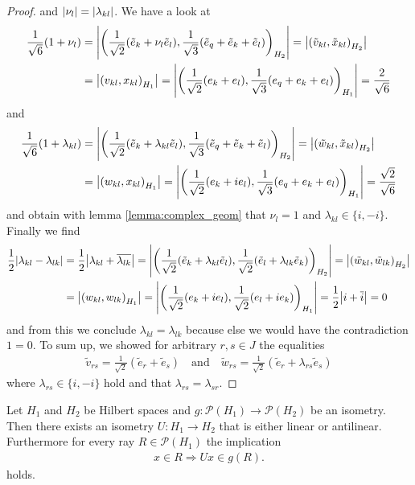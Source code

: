 \begin{proof}
	and ${\left | \nu_l \right |} = {\left | \lambda_{kl} \right |}$. We have a look at 
	\begin{align*}
		\frac{1}{\sqrt{6}}(1 + \nu_l) &= {\left | {\left ( \frac{1}{\sqrt{2}}(\tilde{e}_k + \nu_l \tilde{e}_l), \frac{1}{\sqrt{3}}(\tilde{e}_q + \tilde{e}_k + \tilde{e}_l) \right )}_{H_2} \right |} = {\left | {\left ( \tilde{v}_{kl}, \tilde{x}_{kl} \right )}_{H_2} \right |} \\
		&= {\left | {\left ( v_{kl}, x_{kl} \right )}_{H_1} \right |} = {\left | {\left ( \frac{1}{\sqrt{2}}(e_k + e_l), \frac{1}{\sqrt{3}}(e_q + e_k + e_l) \right )}_{H_1} \right |} = \frac{2}{\sqrt{6}}
	\end{align*}
	and 
	\begin{align*}
		\frac{1}{\sqrt{6}}(1 + \lambda_{kl}) &= {\left | {\left ( \frac{1}{\sqrt{2}}(\tilde{e}_k + \lambda_{kl} \tilde{e}_l), \frac{1}{\sqrt{3}}(\tilde{e}_q + \tilde{e}_k + \tilde{e}_l) \right )}_{H_2} \right |} = {\left | {\left ( \tilde{w}_{kl}, \tilde{x}_{kl} \right )}_{H_2} \right |} \\
		&= {\left | {\left ( w_{kl}, x_{kl} \right )}_{H_1} \right |} = {\left | {\left ( \frac{1}{\sqrt{2}}(e_k + i e_l), \frac{1}{\sqrt{3}}(e_q + e_k + e_l) \right )}_{H_1} \right |} = \frac{\sqrt{2}}{\sqrt{6}}
	\end{align*}
	and obtain with lemma \ref{lemma:complex_geom} that $\nu_l = 1$ and $\lambda_{kl} \in \{i, -i\}$. Finally we find
	\begin{align*}
		\frac{1}{2}{\left | \lambda_{kl} - \lambda_{lk} \right |} &= \frac{1}{2}{\left | \lambda_{kl} + \overline{\lambda_{lk}} \right |} = {\left | {\left ( \frac{1}{\sqrt{2}}(\tilde{e}_k + \lambda_{kl} \tilde{e}_l), \frac{1}{\sqrt{2}}(\tilde{e}_l + \lambda_{lk} \tilde{e}_k) \right )}_{H_2} \right |} = {\left | {\left ( \tilde{w}_{kl}, \tilde{w}_{lk} \right )}_{H_2} \right |} \\
		&= {\left | {\left ( w_{kl}, w_{lk} \right )}_{H_1} \right |} = {\left | {\left ( \frac{1}{\sqrt{2}}(e_k + i e_l), \frac{1}{\sqrt{2}}(e_l + i e_k) \right )}_{H_1} \right |} = \frac{1}{2} {\left | i + \overline{i} \right |} = 0
	\end{align*}
	and from this we conclude $\lambda_{kl} = \lambda_{lk}$ because else we would have the contradiction $1 = 0$. To sum up, we showed for arbitrary $r,s \in J$ the equalities
	\begin{align*}
		\tilde{v}_{rs} = \frac{1}{\sqrt{2}}(\tilde{e}_r + \tilde{e}_s) \quad \text{and} \quad \tilde{w}_{rs} = \frac{1}{\sqrt{2}}(\tilde{e}_r + \lambda_{rs} \tilde{e}_s)
	\end{align*}
	where $\lambda_{rs} \in \{i, -i\}$ hold and that $\lambda_{rs} = \lambda_{sr}$. 
\end{proof}


\begin{theorem} \label{theorem:wigner}
	Let $H_1$ and $H_2$ be Hilbert spaces and $g: \mathcal{P}(H_1) \to \mathcal{P}(H_2)$ be an isometry. Then there exists an isometry $U: H_1 \to H_2$ that is either linear or antilinear. Furthermore for every ray $R \in \mathcal{P}(H_1)$ the implication
	\begin{align*}
		x \in R \Rightarrow Ux \in g(R).
	\end{align*}
	holds.
\end{theorem}

